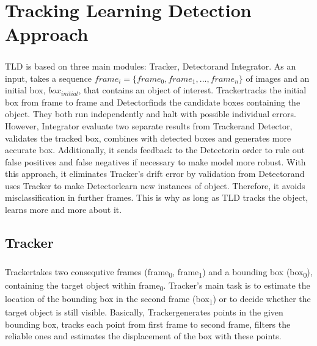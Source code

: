 \documentclass{report}
\newcommand{\Tracker}{Tracker}
\newcommand{\Detector}{Detector}
\newcommand{\Integrator}{Integrator}
\newcommand{\initialbox}{$ box_{initial} $}
\begin{document}

    \chapter{Tracking Learning Detection Approach}
    \paragraph{}
        TLD is based on three main modules: \Tracker, \Detector and \Integrator.
        As an input, takes a sequence $ frame_{i} = \{ frame_{0}, frame_{1}, ..., frame_{n} \}$ of images
        and an initial box, \initialbox, that contains an object of interest.
        \Tracker tracks the initial box from frame to frame and \Detector finds the candidate boxes containing the object.
        They both run independently and halt with possible individual errors. However, Integrator
        evaluate two separate results from \Tracker and \Detector, validates the tracked box, combines with detected boxes
        and generates more accurate box.
        Additionally, it sends feedback to the \Detector in order to rule out false positives and false negatives
        if necessary to make model more robust.
        With this approach, it eliminates \Tracker's drift error by validation from \Detector and uses \Tracker
        to make \Detector learn new instances of object. Therefore, it avoids misclassification in further frames.
        This is why as long as TLD tracks the object, learns more and more about it.
    \section{Tracker}
        \paragraph{}
            \Tracker takes two consequtive frames (frame\textsubscript{0}, frame\textsubscript{1})
            and a bounding box (box\textsubscript{0}), containing the target object within frame\textsubscript{0}.
            \Tracker's main task is to estimate the location of the bounding box in the second frame (box\textsubscript{1})
            or to decide whether the target object is still visible. Basically, \Tracker generates points in the given
            bounding box, tracks each point from first frame to second frame, filters the reliable ones and estimates
            the displacement of the box with these points.
\end{document}
